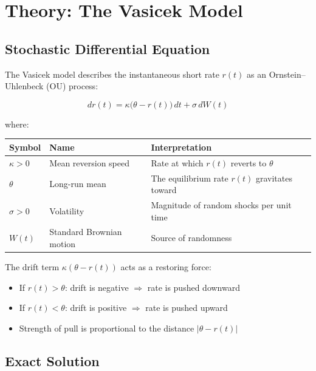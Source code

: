 \documentclass[11pt, letterpaper]{article}
\begin{document}
\section{Theory: The Vasicek Model}

\subsection{Stochastic Differential Equation}

The Vasicek model describes the instantaneous short rate $r(t)$ as an
Ornstein--Uhlenbeck (OU) process:

\begin{equation}
  dr(t) = \kappa\bigl(\theta - r(t)\bigr)\,dt + \sigma\,dW(t)
\end{equation}

\noindent where:

\begin{center}
\begin{tabular}{@{}lL{3.5cm}L{7cm}@{}}
  \toprule
  \textbf{Symbol} & \textbf{Name} & \textbf{Interpretation} \\
  \midrule
  $\kappa > 0$ & Mean reversion speed & Rate at which $r(t)$ reverts to $\theta$ \\
  $\theta$     & Long-run mean        & The equilibrium rate $r(t)$ gravitates toward \\
  $\sigma > 0$ & Volatility           & Magnitude of random shocks per unit time \\
  $W(t)$       & Standard Brownian motion & Source of randomness \\
  \bottomrule
\end{tabular}
\end{center}

\noindent The drift term $\kappa(\theta - r(t))$ acts as a restoring force:
\begin{itemize}
  \item If $r(t) > \theta$: drift is negative $\Rightarrow$ rate is pushed downward
  \item If $r(t) < \theta$: drift is positive $\Rightarrow$ rate is pushed upward
  \item Strength of pull is proportional to the distance $|\theta - r(t)|$
\end{itemize}

\subsection{Exact Solution}
\end{document}
